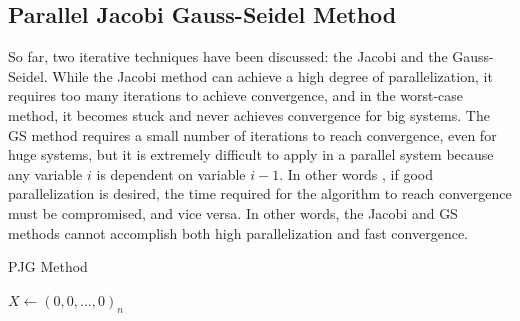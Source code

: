 \documentclass[11pt]{article}       %
\begin{document}
\subsection{Parallel Jacobi Gauss-Seidel Method}

So far, two iterative techniques have been discussed: the Jacobi and the Gauss-Seidel. While the Jacobi method can achieve a high degree of parallelization, it requires too many iterations to achieve convergence, and in the worst-case method, it becomes stuck and never achieves convergence for big systems. The GS method requires a small number of iterations to reach convergence, even for huge systems, but it is extremely difficult to apply in a parallel system because any variable $i$ is dependent on variable $i-1$. In other words , if good parallelization is desired, the time required for the algorithm to reach convergence must be compromised, and vice versa. In other words, the Jacobi and GS methods cannot accomplish both high parallelization and fast convergence.

\begin{algorithm}
\DontPrintSemicolon 
{}
\caption{PJG Method}\label{alg:pjg}
$X \gets (0,0,...,0)_n$\;
\end{algorithm}
\end{document}
